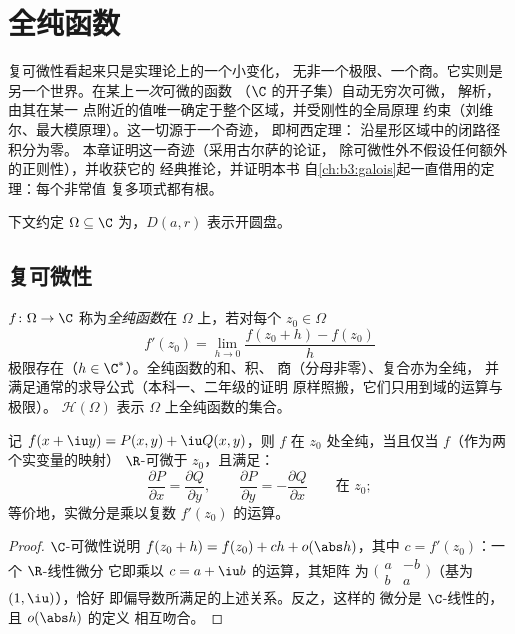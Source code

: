 \chapter{全纯函数}\label{ch:b3:holomorphic}

复可微性看起来只是实理论上的一个小变化，
无非一个极限、一个商。它实则是
另一个世界。在某上\emph{一次}可微的函数
（$\C$ 的开子集）自动无穷次可微，
解析，由其在某一
点附近的值唯一确定于整个区域，并受刚性的全局原理
约束（刘维尔、最大模原理）。这一切源于一个奇迹，
即柯西定理：
沿星形区域中的闭路径积分为零。
本章证明这一奇迹（采用古尔萨的论证，
除可微性外不假设任何额外的正则性），并收获它的
经典推论，并证明本书
自\cref{ch:b3:galois}起一直借用的定理：每个非常值
复多项式都有根。

下文约定 $\Omega \subseteq \C$ 为，$D(a, r)$
表示开圆盘。

\section{复可微性}

\begin{definition}\label{def:b3:holomorphic:holo}
$f \colon \Omega \to \C$ 称为\emph{全纯函数}在 $\Omega$ 上，若对每个 $z_0 \in \Omega$
\[
f'(z_0) = \lim_{h\to0}\frac{f(z_0 + h) - f(z_0)}{h}
\]
极限存在（$h \in \C^*$）。全纯函数的和、积、
商（分母非零）、复合亦为全纯，
并满足通常的求导公式（本科一、二年级的证明
原样照搬，它们只用到域的运算与极限）。
$\mathcal H(\Omega)$ 表示
$\Omega$ 上全纯函数的集合。
\end{definition}

\begin{proposition}[柯西–黎曼]
\label{prop:b3:holomorphic:cauchyriemann}
记 $f(x + \iu y) = P(x,y) + \iu Q(x,y)$，则 $f$
在 $z_0$ 处全纯，当且仅当 $f$（作为两个实变量的映射）
$\R$-可微于 $z_0$，且满足：
\[
\frac{\partial P}{\partial x} = \frac{\partial Q}{\partial y},
\qquad
\frac{\partial P}{\partial y} = -\frac{\partial Q}{\partial x}
\qquad \text{在 } z_0 ;
\]
等价地，实微分是乘以复数
$f'(z_0)$ 的运算。
\end{proposition}

\begin{proof}
$\C$-可微性说明 $f(z_0 + h) = f(z_0) + ch +
o(\abs h)$，其中 $c = f'(z_0)$：一个 $\R$-线性微分
它即乘以 $c = a + \iu b$ 的运算，其矩阵
为 $\bigl(\begin{smallmatrix} a & -b\\ b & a
\end{smallmatrix}\bigr)$（基为 $(1, \iu)$），恰好
即偏导数所满足的上述关系。反之，这样的
微分是 $\C$-线性的，且 $o(\abs h)$ 的定义
相互吻合。
\end{proof}

